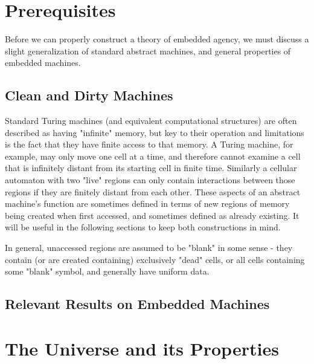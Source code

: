\documentclass[12pt]{article}
\theoremstyle{definition}
\begin{document}
\section{Prerequisites}
\label{sec:prereqs}

Before we can properly construct a theory of embedded agency, we must discuss a
slight generalization of standard abstract machines, and general properties of
embedded machines.

\subsection{Clean and Dirty Machines}
\label{sec:dirty}


Standard Turing machines (and equivalent computational structures) are often described as having
"infinite" memory, but key to their operation and limitations is the fact that they have finite
access to that memory. A Turing machine, for example, may only move one cell at a time, and
therefore cannot examine a cell that is infinitely distant from its starting cell in finite time.
Similarly a cellular automaton with two "live" regions can only contain interactions between those
regions if they are finitely distant from each other. These aspects of an abstract machine's
function are sometimes defined in terms of new regions of memory being created when first accessed,
and sometimes defined as already existing. It will be useful in the following sections to keep both
constructions in mind.

In general, unaccessed regions are assumed to be "blank" in some sense - they contain (or are
created containing) exclusively "dead" cells, or all cells containing some "blank" symbol, and 
generally have uniform data. 

\subsection{Relevant Results on Embedded Machines}
\label{sec:embedding}


\section{The Universe and its Properties}
\label{sec:universe}
\end{document}

